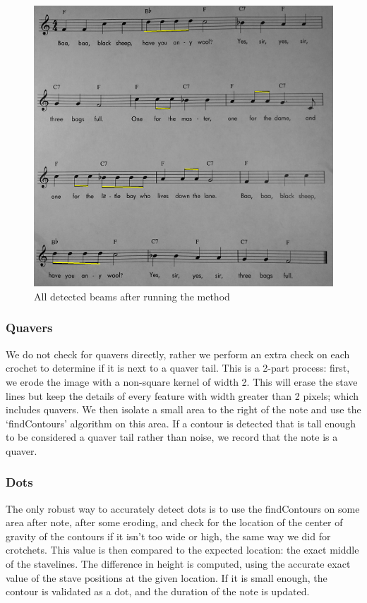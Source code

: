 \begin{figure}[h!]
    \centering
    \includegraphics[width=1\textwidth]{./assets/beamsdetected.png}
    \caption{All detected beams after running the method}
    \label{image:beamsdetected}
\end{figure}

\subsubsection{Quavers}

We do not check for quavers directly, rather we perform an extra check on each crochet to determine if it is next to a quaver tail. This is a 2-part process: first, we erode the image with a non-square kernel of width 2. This will erase the stave lines but keep the details of every feature with width greater than 2 pixels; which includes
quavers. We then isolate a small area to the right of the note and use the ‘findContours’ algorithm on this area. If a contour is detected that is tall enough to be considered a quaver tail rather than noise, we record that the note is a quaver.

\subsubsection{Dots}

The only robust way to accurately detect dots is to use the findContours on some area after note, after some eroding, and check for the location of the center of gravity of the contours if it isn’t too wide or high, the same way we did for crotchets. This value is then compared to the expected location: the exact middle of
the stavelines. The difference in height is computed, using the accurate exact value of the stave positions at the given location. If it is small enough, the contour is validated as a dot, and the duration of the note is updated.

